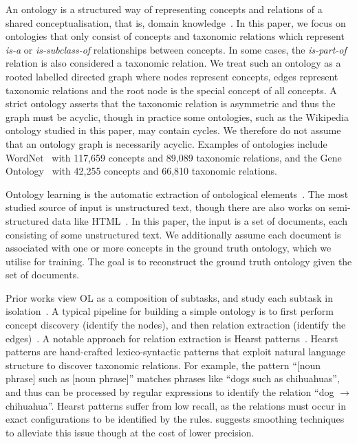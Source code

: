 \documentclass{article}
\begin{document}
An ontology is a structured way of representing concepts and relations of a shared conceptualisation, that is, domain knowledge~\cite{gruber1995toward,gruber1993translation}. In this paper, we focus on ontologies that only consist of concepts and taxonomic relations which represent \emph{is-a} or \emph{is-subclass-of} relationships between concepts. In some cases, the \emph{is-part-of} relation is also considered a taxonomic relation. We treat such an ontology as a rooted labelled directed graph where nodes represent concepts, edges represent taxonomic relations and the root node is the special concept of all concepts. A strict ontology asserts that the taxonomic relation is asymmetric and thus the graph must be acyclic, though in practice some ontologies, such as the Wikipedia ontology studied in this paper, may contain cycles. We therefore do not assume that an ontology graph is necessarily acyclic. Examples of ontologies include WordNet~\cite{miller1995wordnet} with 117,659 concepts and 89,089 taxonomic relations, and the Gene Ontology~\cite{ashburner2000gene} with 42,255 concepts and 66,810 taxonomic relations.

Ontology learning is the automatic extraction of ontological elements~\cite{hazman2011survey}. The most studied source of input is unstructured text, though there are also works on semi-structured data like HTML~\cite{karoui2004ontology}. In this paper, the input is a set of documents, each consisting of some unstructured text. We additionally assume each document is associated with one or more concepts in the ground truth ontology, which we utilise for training. The goal is to reconstruct the ground truth ontology given the set of documents.%

Prior works view OL as a composition of subtasks, and study each subtask in isolation~\cite{buitelaar2005ontology,asim2018survey}. A typical pipeline for building a simple ontology is to first perform concept discovery (identify the nodes), and then relation extraction (identify the edges)~\cite{cimiano2005text2onto,kaushik2018automatic}. A notable approach for relation extraction is Hearst patterns~\cite{hearst1998automated}. Hearst patterns are hand-crafted lexico-syntactic patterns that exploit natural language structure to discover taxonomic relations. For example, the pattern ``[noun phrase] such as [noun phrase]'' matches phrases like ``dogs such as chihuahuas'', and thus can be processed by regular expressions to identify the relation ``dog $\to$ chihuahua''. Hearst patterns suffer from low recall, as the relations must occur in exact configurations to be identified by the rules. \citet{roller2018hearst} suggests smoothing techniques to alleviate this issue though at the cost of lower precision.
\end{document}
